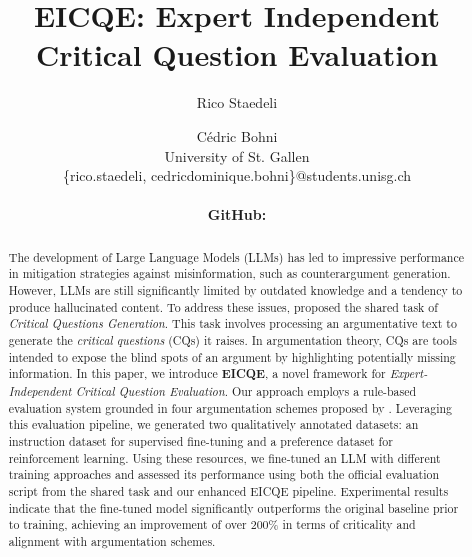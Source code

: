 \documentclass[11pt]{article}
\title{EICQE: Expert Independent Critical Question Evaluation}
\author{
  Rico Staedeli \and Cédric Bohni \\
  University of St. Gallen \\
  \{rico.staedeli, cedricdominique.bohni\}@students.unisg.ch \\ \\
 \textbf{GitHub:} \href{https://github.com/RicoStaedeli/NLP2025_CQG}{\text{https://github.com/RicoStaedeli/NLP2025\_CQG}}
}
\begin{document}
\pagestyle{plain}

\maketitle
\begin{abstract}
The development of Large Language Models (LLMs) has led to impressive performance in mitigation strategies against misinformation, such as counterargument generation. However, LLMs are still significantly limited by outdated knowledge and a tendency to produce hallucinated content. To address these issues, \citet{calvo_figueras_critical_2024} proposed the shared task of \textit{Critical Questions Generation}. This task involves processing an argumentative text to generate the \textit{critical questions} (CQs) it raises. In argumentation theory, CQs are tools intended to expose the blind spots of an argument by highlighting potentially missing information. In this paper, we introduce \textbf{EICQE}, a novel framework for \emph{Expert-Independent Critical Question Evaluation}. Our approach employs a rule-based evaluation system grounded in four argumentation schemes proposed by \citet{walton_argumentation_2008}. Leveraging this evaluation pipeline, we generated two qualitatively annotated datasets: an instruction dataset for supervised fine-tuning and a preference dataset for reinforcement learning. Using these resources, we fine-tuned an LLM with different training approaches and assessed its performance using both the official evaluation script from the shared task and our enhanced EICQE pipeline. Experimental results indicate that the fine-tuned model significantly outperforms the original baseline prior to training, achieving an improvement of over $200\%$ in terms of criticality and alignment with argumentation schemes.
\end{abstract}
\end{document}
